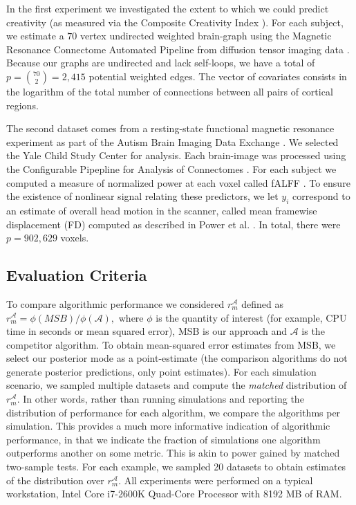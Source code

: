 \documentclass{article} %
\providecommand{\mc}[1]{\mathcal{#1}}
\begin{document}
In the first experiment we investigated the extent to which we could predict creativity (as measured via the Composite Creativity Index \cite{Arden2010}).   For each subject, we estimate a $70$ vertex undirected weighted brain-graph using the Magnetic Resonance Connectome Automated Pipeline \cite{MRCAP11} from diffusion tensor imaging data \cite{Mori2006}. Because our graphs are undirected and lack self-loops, we have a total of $p=\binom{70}{2}=2,415$ potential weighted edges. The vector of covariates consists in the logarithm of the total number of connections between all pairs of cortical regions. 

The second dataset comes from a resting-state functional magnetic resonance experiment as part of the Autism Brain Imaging Data Exchange \cite{Autism}.  We selected the Yale Child Study Center for analysis.  Each brain-image was processed using the Configurable Pipepline for Analysis of Connectomes \cite{cpac}. For each subject we computed a measure of normalized power at each voxel called fALFF \cite{Zou2008}.  To ensure the existence of nonlinear signal relating these predictors, we let $y_i$ correspond to an estimate of overall head motion in the scanner, called mean framewise displacement (FD) computed as described in Power et al. \cite{power}. In total, there were $p=902,629$ voxels. 

\subsection{Evaluation Criteria}

To compare algorithmic performance we considered $r_{m}^{\mc{A}}$ defined as $r_{m}^{\mc{A}}=\phi(MSB)/\phi(\mc{A}),$
where $\phi$ is the quantity of interest (for example, CPU time in seconds or mean squared error), MSB is our approach and $\mc{A}$ is the competitor algorithm. To obtain mean-squared error estimates from MSB, we select our posterior mode as a point-estimate (the comparison algorithms do not generate posterior predictions, only point estimates).
For each simulation scenario, we sampled multiple datasets and compute the \emph{matched} distribution of $r_{m}^{\mc{A}}$. In other words, rather than running simulations and reporting the distribution of performance for each algorithm, we compare the algorithms per simulation.  This provides a much more informative indication of algorithmic performance, in that we indicate the fraction of simulations one algorithm outperforms another on some metric.  This is akin to power gained by matched two-sample tests.   For each example, we sampled 20 datasets to obtain estimates of the distribution over $r_m^{\mc{A}}$.
% 
All experiments were performed on a typical workstation, Intel Core i7-2600K Quad-Core Processor with  8192 MB of RAM.
\end{document}
